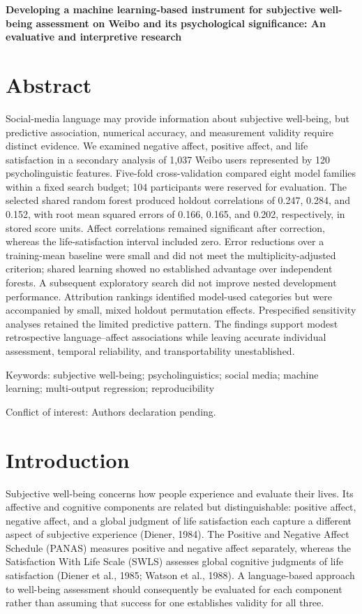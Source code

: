 \documentclass[11pt,letterpaper]{article}
\begin{document}
\begin{center}\fontsize{16}{20}\selectfont\bfseries Developing a machine learning-based instrument for subjective well-being assessment on Weibo and its psychological significance: An evaluative and interpretive research\end{center}
\section{Abstract}\label{abstract}

Social-media language may provide information about subjective well-being, but predictive association, numerical accuracy, and measurement validity require distinct evidence. We examined negative affect, positive affect, and life satisfaction in a secondary analysis of 1,037 Weibo users represented by 120 psycholinguistic features. Five-fold cross-validation compared eight model families within a fixed search budget; 104 participants were reserved for evaluation. The selected shared random forest produced holdout correlations of 0.247, 0.284, and 0.152, with root mean squared errors of 0.166, 0.165, and 0.202, respectively, in stored score units. Affect correlations remained significant after correction, whereas the life-satisfaction interval included zero. Error reductions over a training-mean baseline were small and did not meet the multiplicity-adjusted criterion; shared learning showed no established advantage over independent forests. A subsequent exploratory search did not improve nested development performance. Attribution rankings identified model-used categories but were accompanied by small, mixed holdout permutation effects. Prespecified sensitivity analyses retained the limited predictive pattern. The findings support modest retrospective language--affect associations while leaving accurate individual assessment, temporal reliability, and transportability unestablished.

Keywords: subjective well-being; psycholinguistics; social media; machine learning; multi-output regression; reproducibility

Conflict of interest: Authors\textquotesingle{} declaration pending.

\section{Introduction}\label{introduction}

Subjective well-being concerns how people experience and evaluate their lives. Its affective and cognitive components are related but distinguishable: positive affect, negative affect, and a global judgment of life satisfaction each capture a different aspect of subjective experience (Diener, 1984). The Positive and Negative Affect Schedule (PANAS) measures positive and negative affect separately, whereas the Satisfaction With Life Scale (SWLS) assesses global cognitive judgments of life satisfaction (Diener et al., 1985; Watson et al., 1988). A language-based approach to well-being assessment should consequently be evaluated for each component rather than assuming that success for one establishes validity for all three.
\end{document}
